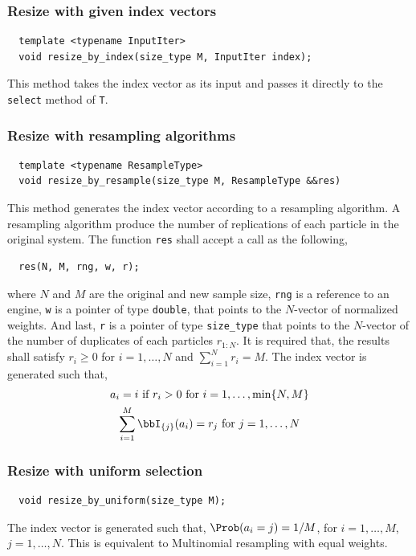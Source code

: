 \subsubsection{Resize with given index vectors}

\begin{Verbatim}
  template <typename InputIter>
  void resize_by_index(size_type M, InputIter index);
\end{Verbatim}
This method takes the index vector as its input and passes it directly to the
\verb|select| method of \verb|T|.

\subsubsection{Resize with resampling algorithms}

\begin{Verbatim}
  template <typename ResampleType>
  void resize_by_resample(size_type M, ResampleType &&res)
\end{Verbatim}
This method generates the index vector according to a resampling algorithm. A
resampling algorithm produce the number of replications of each particle in the
original system. The function \verb|res| shall accept a call as the following,
\begin{Verbatim}
  res(N, M, rng, w, r);
\end{Verbatim}
where $N$ and $M$ are the original and new sample size, \verb|rng| is a
reference to an \rng engine, \verb|w| is a pointer of type \verb|double|, that
points to the $N$-vector of normalized weights. And last, \verb|r| is a pointer
of type \verb|size_type| that points to the $N$-vector of the number of
duplicates of each particles $r_{1:N}$. It is required that, the results shall
satisfy $r_i\ge0$ for $i=1,\dots,N$ and $\sum_{i=1}^N r_i = M$. The index
vector is generated such that,
\begin{gather*}
  a_i = i \text{ if } r_i > 0 \text{ for } i = 1,\dots,\min\{N, M\} \\
  \sum_{i=1}^M\bbI_{\{j\}}(a_i) = r_j \text{ for } j = 1,\dots,N
\end{gather*}

\subsubsection{Resize with uniform selection}

\begin{Verbatim}
  void resize_by_uniform(size_type M);
\end{Verbatim}
The index vector is generated such that, $\Prob(a_i = j) = 1/M$, for $i =
1,\dots,M$, $j = 1,\dots,N$. This is equivalent to Multinomial resampling with
equal weights.

